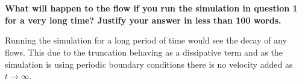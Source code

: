 \documentclass[10pt, a4paper]{article}
\begin{document}
\section{}
\textbf{What will happen to the flow if you run the simulation in question 1 for a very long time? Justify your answer in less than 100 words.}

Running the simulation for a long period of time would see the decay of any flows. This due to the truncation behaving as a dissipative term and as the simulation is using periodic boundary conditions there is no velocity added as $t \rightarrow \infty$. 

\newpage
%
\end{document}

